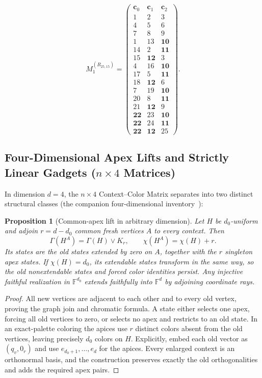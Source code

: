 \documentclass[aps,pra,reprint,superscriptaddress,longbibliography,nofootinbib,floatfix,10pt]{revtex4-2}
\newtheorem{proposition}[theorem]{Proposition}
\theoremstyle{definition}\newtheorem{definition}[theorem]{Definition}
\theoremstyle{remark}\newtheorem{remark}[theorem]{Remark}
\newcommand{\F}{\mathbb F}\newcommand{\Z}{\mathbb Z}\newcommand{\PP}{\mathbb P}
\begin{document}
\begin{equation}\label{eq:R25-matrix}
M_1^{(R_{25,15})}=\begin{pmatrix}
\mathbf{c}_0 & \mathbf{c}_1 & \mathbf{c}_2\\\hline
1 & 2 & 3\\
4 & 5 & 6\\
7 & 8 & 9\\\hline
1 & 13 & \mathbf{10}\\
14 & 2 & \mathbf{11}\\
15 & \mathbf{12} & 3\\
4 & 16 & \mathbf{10}\\
17 & 5 & \mathbf{11}\\
18 & \mathbf{12} & 6\\
7 & 19 & \mathbf{10}\\
20 & 8 & \mathbf{11}\\
21 & \mathbf{12} & 9\\\hline
\mathbf{22} & 23 & \mathbf{10}\\
\mathbf{22} & 24 & \mathbf{11}\\
\mathbf{22} & \mathbf{12} & 25
\end{pmatrix}.
\end{equation}

\subsection{Four-Dimensional Apex Lifts and Strictly Linear Gadgets (\texorpdfstring{$n\times 4$}{n x 4} Matrices)}\label{sec:4d-gadgets}

In dimension $d=4$, the $n\times 4$ Context--Color Matrix separates into two distinct structural classes (the companion four-dimensional inventory~\cite{svozil2026contexts}):

\begin{proposition}[Common-apex lift in arbitrary dimension]\label{prop:general-apex}
Let $H$ be $d_0$-uniform and adjoin $r=d-d_0$ common fresh vertices $A$ to every context. Then
\[
\Gamma(H^A)=\Gamma(H)\vee K_r,\qquad\chi(H^A)=\chi(H)+r.
\]
Its states are the old states extended by zero on $A$, together with the $r$ singleton apex states. If $\chi(H)=d_0$, its extendable states transform in the same way, so the old nonextendable states and forced color identities persist. Any injective faithful realization in $\F^{d_0}$ extends faithfully into $\F^d$ by adjoining coordinate rays.
\end{proposition}
\begin{proof}
All new vertices are adjacent to each other and to every old vertex, proving the graph join and chromatic formula. A state either selects one apex, forcing all old vertices to zero, or selects no apex and restricts to an old state. In an exact-palette coloring the apices use $r$ distinct colors absent from the old vertices, leaving precisely $d_0$ colors on $H$. Explicitly, embed each old vector as $(q_v,0_r)$ and use $e_{d_0+1},\ldots,e_d$ for the apices. Every enlarged context is an orthonormal basis, and the construction preserves exactly the old orthogonalities and adds the required apex pairs.
\end{proof}
\end{document}
